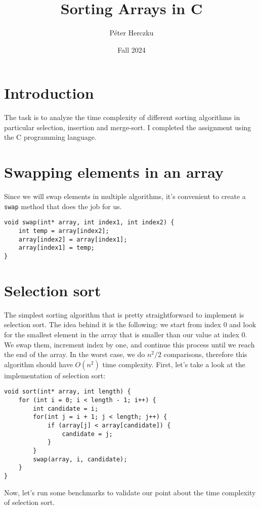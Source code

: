 \documentclass[a4paper,11pt]{article}
\begin{document}
    \title{
        \textbf{Sorting Arrays in C}
    }
    \author{Péter Herczku}
    \date{Fall 2024}

    \maketitle

    \section*{Introduction}

    The task is to analyze the time complexity of different sorting algorithms in particular selection, insertion and merge-sort.
    I completed the assignment using the C programming language.

    \section*{Swapping elements in an array}

    Since we will swap elements in multiple algorithms, it's convenient to create a {\tt swap} method that does the job for us.

    \begin{verbatim}
void swap(int* array, int index1, int index2) {
    int temp = array[index2];
    array[index2] = array[index1];
    array[index1] = temp;
}
    \end{verbatim}

    \section*{Selection sort}

    The simplest sorting algorithm that is pretty straightforward to implement is selection sort.
    The idea behind it is the following: we start from index 0 and look for the smallest element in the array that is smaller than our value at index 0.
    We swap them, increment index by one, and continue this process until we reach the end of the array.
    In the worst case, we do $n^2/2$ comparisons, therefore this algorithm should have $O(n^2)$ time complexity.
    First, let's take a look at the implementation of selection sort:

    \begin{verbatim}
void sort(int* array, int length) {
    for (int i = 0; i < length - 1; i++) {
        int candidate = i;
        for(int j = i + 1; j < length; j++) {
            if (array[j] < array[candidate]) {
                candidate = j;
            }
        }
        swap(array, i, candidate);
    }
}
    \end{verbatim}
    Now, let's run some benchmarks to validate our point about the time complexity of selection sort.
\end{document}
